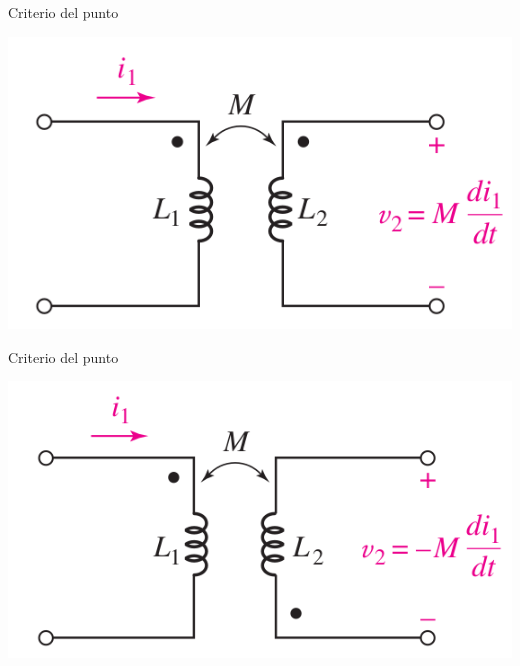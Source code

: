 \documentclass[xcolor={usenames,svgnames,dvipsnames}]{beamer}
\begin{document}
\begin{frame}[label={sec:orgfdb5351}]{Criterio del punto}
\begin{center}
\includegraphics[width=.9\linewidth]{figs/punto1.png}
\end{center}
\end{frame}

\begin{frame}[label={sec:org7c327e6}]{Criterio del punto}
\begin{center}
\includegraphics[width=.9\linewidth]{figs/punto2.png}
\end{center}
\end{frame}
\end{document}
